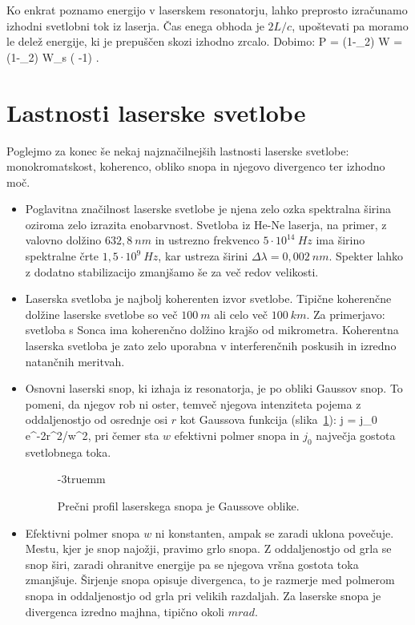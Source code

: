 Ko enkrat poznamo energijo v laserskem resonatorju, lahko preprosto
izračunamo izhodni svetlobni tok iz laserja. Čas enega obhoda je $2L/c$,
upoštevati pa moramo le delež energije, ki je prepuščen skozi izhodno zrcalo. 
Dobimo: 
\beq
P = (1-_2) W 
= (1-_2) W_s \left( -1\right) .
\label{eq:11_58}
\eeq

\section{Lastnosti laserske svetlobe}
Poglejmo za konec še nekaj najznačilnejših lastnosti laserske svetlobe: 
monokromatskost, koherenco, obliko snopa in njegovo divergenco ter izhodno moč. 
\begin{itemize}
\item Poglavitna značilnost laserske svetlobe je njena zelo ozka spektralna
širina oziroma zelo izrazita enobarvnost. Svetloba iz He-Ne laserja, 
na primer, z valovno dolžino $632,8~\si{nm}$ in ustrezno frekvenco $
5 \cdot 10^{14}~\si{Hz}$ ima širino spektralne črte 
$1,5 \cdot 10^{9}~\si{Hz}$, kar ustreza širini $\Delta \lambda = 0,002~\si{nm}$.
Spekter lahko z dodatno stabilizacijo 
zmanjšamo še za več redov velikosti. 

\item Laserska svetloba je najbolj koherenten izvor svetlobe. Tipične 
koherenčne dolžine laserske svetlobe so več $100~\si{m}$ ali celo 
več $100~\si{km}$. Za primerjavo: svetloba s Sonca ima koherenčno dolžino
krajšo od mikrometra. Koherentna laserska svetloba je zato zelo uporabna
v interferenčnih poskusih in izredno natančnih meritvah.

\item Osnovni laserski snop, ki izhaja iz resonatorja, je po obliki
Gaussov snop. To pomeni, da njegov rob ni oster, temveč njegova 
intenziteta pojema z oddaljenostjo
od osrednje osi $r$ kot Gaussova funkcija (slika~\ref{fig:11_Gauss}):
\beq
j = j_0 e^{-2r^2/w^2},
\eeq
pri čemer sta $w$ efektivni polmer snopa in $j_0$ največja gostota
svetlobnega toka. 
\begin{figure}[h!]
\centering
\def\svgwidth{60truemm} 

\caption{Prečni profil laserskega snopa je Gaussove oblike.
}
\label{fig:11_Gauss}
\vglue-3truemm
\end{figure}
\item Efektivni polmer snopa $w$ ni konstanten, ampak
se zaradi uklona povečuje. Mestu, kjer je snop najožji, pravimo grlo snopa.
Z oddaljenostjo od grla se snop širi, zaradi ohranitve energije pa 
se njegova vršna gostota toka zmanjšuje. Širjenje snopa opisuje divergenca, to je razmerje med 
polmerom  snopa in oddaljenostjo od grla pri velikih razdaljah. 
Za laserske snopa je divergenca izredno majhna, tipično okoli $\si{mrad}$.


\end{itemize}
